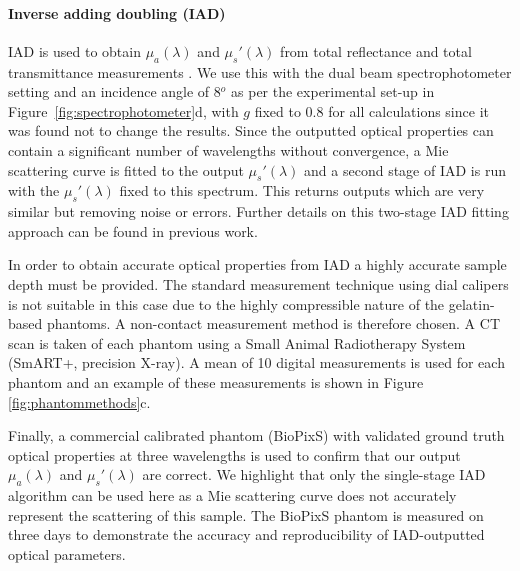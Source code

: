 \paragraph{Inverse adding doubling (IAD)}\label{sec:methodsphantommeasure2}
IAD is used to obtain $\mu_a(\lambda)$ and $\mu_s'(\lambda)$ from total reflectance and total transmittance measurements \cite{Prahl2017}. We use this with the dual beam spectrophotometer setting and an incidence angle of 8$^o$ as per the experimental set-up in Figure~\ref{fig:spectrophotometer}d, with $g$ fixed to 0.8 for all calculations since it was found not to change the results. Since the outputted optical properties can contain a significant number of wavelengths without convergence, a Mie scattering curve is fitted to the output $\mu_s'(\lambda)$ and a second stage of IAD is run with the $\mu_s'(\lambda)$ fixed to this spectrum.
This returns outputs which are very similar but removing noise or errors.
Further details on this two-stage IAD fitting approach can be found in previous work\cite{Xie2021}. 

In order to obtain accurate optical properties from IAD a highly accurate sample depth must be provided. 
The standard measurement technique using dial calipers is not suitable in this case due to the highly compressible nature of the gelatin-based phantoms.
A non-contact measurement method is therefore chosen. A
CT scan is taken of each phantom using a Small Animal Radiotherapy System (SmART+, precision X-ray). A mean of 10 digital measurements is used for each phantom and an example of these measurements is shown in Figure \ref{fig:phantommethods}c.

Finally, a commercial calibrated phantom (BioPixS) with validated ground truth optical properties at three wavelengths is used to confirm that our output $\mu_a(\lambda)$ and $\mu_s'(\lambda)$ are correct. We highlight that only the single-stage IAD algorithm can be used here as a Mie scattering curve does not accurately represent the scattering of this sample. The BioPixS phantom is measured on three days to demonstrate the accuracy and reproducibility of IAD-outputted optical parameters.


